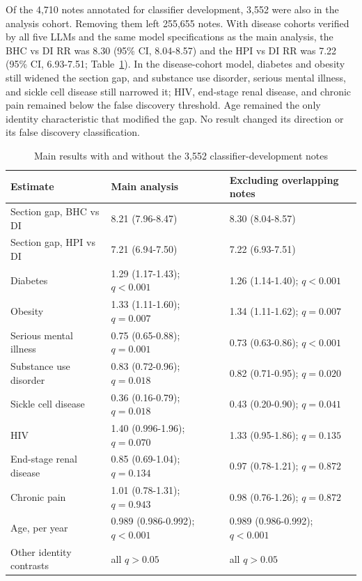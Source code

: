 \documentclass[unnumsec,webpdf,contemporary,large]{oup-authoring-template}
\begin{document}
Of the 4,710 notes annotated for classifier development, 3,552 were also in the analysis cohort. Removing them left 255,655 notes. With disease cohorts verified by all five LLMs and the same model specifications as the main analysis, the BHC vs DI RR was 8.30 (95\% CI, 8.04-8.57) and the HPI vs DI RR was 7.22 (95\% CI, 6.93-7.51; Table~\ref{tab:s_overlap}). In the disease-cohort model, diabetes and obesity still widened the section gap, and substance use disorder, serious mental illness, and sickle cell disease still narrowed it; HIV, end-stage renal disease, and chronic pain remained below the false discovery threshold. Age remained the only identity characteristic that modified the gap. No result changed its direction or its false discovery classification.

\begin{table}[H]
\caption{Main results with and without the 3,552 classifier-development notes}
\label{tab:s_overlap}
\centering
\small
\begin{tabular}{lll}
\toprule
Estimate & Main analysis & Excluding overlapping notes \\
\midrule
Section gap, BHC vs DI & 8.21 (7.96-8.47) & 8.30 (8.04-8.57) \\
Section gap, HPI vs DI & 7.21 (6.94-7.50) & 7.22 (6.93-7.51) \\
Diabetes & 1.29 (1.17-1.43); $q<0.001$ & 1.26 (1.14-1.40); $q<0.001$ \\
Obesity & 1.33 (1.11-1.60); $q=0.007$ & 1.34 (1.11-1.62); $q=0.007$ \\
Serious mental illness & 0.75 (0.65-0.88); $q=0.001$ & 0.73 (0.63-0.86); $q<0.001$ \\
Substance use disorder & 0.83 (0.72-0.96); $q=0.018$ & 0.82 (0.71-0.95); $q=0.020$ \\
Sickle cell disease & 0.36 (0.16-0.79); $q=0.018$ & 0.43 (0.20-0.90); $q=0.041$ \\
HIV & 1.40 (0.996-1.96); $q=0.070$ & 1.33 (0.95-1.86); $q=0.135$ \\
End-stage renal disease & 0.85 (0.69-1.04); $q=0.134$ & 0.97 (0.78-1.21); $q=0.872$ \\
Chronic pain & 1.01 (0.78-1.31); $q=0.943$ & 0.98 (0.76-1.26); $q=0.872$ \\
Age, per year & 0.989 (0.986-0.992); $q<0.001$ & 0.989 (0.986-0.992); $q<0.001$ \\
Other identity contrasts & all $q>0.05$ & all $q>0.05$ \\
\bottomrule
\end{tabular}

\end{table}
\end{document}
